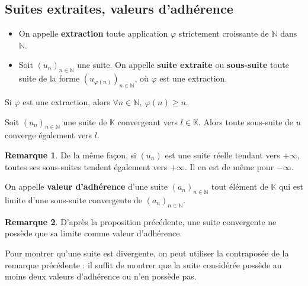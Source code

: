 \documentclass[french]{article}
\newcommand{\N}{\mathbb{N}}
\newcommand{\K}{\mathbb{K}}
\theoremstyle{plain}
\theoremstyle{definition}
\newtheorem*{rmq}{Remarque}
\theoremstyle{remark}
\begin{document}
\subsection{Suites extraites, valeurs d'adhérence}

\begin{dfn}
	\begin{itemize}
		\item On appelle \textbf{extraction} toute application $\varphi$ strictement croissante de $\N$ dans $\N$.
		\item Soit $(u_n)_{n\in\N}$ une suite. On appelle \textbf{suite extraite} ou \textbf{sous-suite} toute suite de la forme $(u_{\varphi(n)})_{n\in\N}$, où $\varphi$ est une extraction.
	\end{itemize}
\end{dfn}

\begin{lem}%
	Si $\varphi$ est une extraction, alors $\forall n\in\N,\ \varphi(n)\geqslant n$.
\end{lem}

\begin{prop}%
	Soit $(u_n)_{n\in\N}$ une suite de $\K$ convergeant vers $l\in\K$. Alors toute sous-suite de $u$ converge également vers $l$.
\end{prop}

\begin{rmq}
	De la même façon, si $(u_n)$ est une suite réelle tendant vers $+\infty$, toutes ses sous-suites tendent également vers $+\infty$. Il en est de même pour $-\infty$.
\end{rmq}

\begin{dfn}
	On appelle \textbf{valeur d'adhérence} d'une suite $(a_n)_{n\in\N}$ tout élément de $\K$ qui est limite d'une sous-suite convergente de $(a_n)_{n\in\N}$.
\end{dfn}

\begin{rmq}
	D'après la proposition précédente, une suite convergente ne possède que sa limite comme valeur d'adhérence.
\end{rmq}

\begin{met}
	Pour montrer qu'une suite est divergente, on peut utiliser la contraposée de la remarque précédente : il suffit de montrer que la suite considérée possède au moins deux valeurs d'adhérence ou n'en possède pas.
\end{met}
\end{document}
